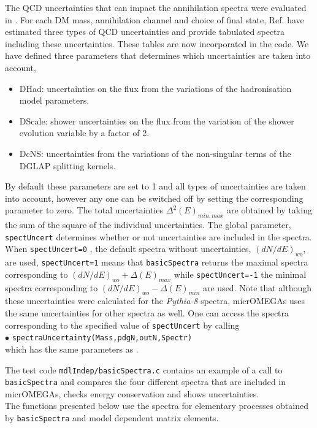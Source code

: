 \documentclass[12pt,a4paper]{article}
\begin{document}
The QCD uncertainties that can impact the  annihilation spectra  were evaluated in \cite{Jueid:2022qjg}. For each DM mass, annihilation channel and choice of final state, Ref.\cite{Jueid:2022qjg} have estimated three types of QCD uncertainties and provide tabulated spectra including these uncertainties.   These tables are now incorporated in the code. 
We have defined three parameters that determines which  uncertainties are taken into account,\begin{itemize}
   \item{DHad:}  uncertainties on the flux from the variations of the hadronisation model parameters.
   \item{DScale:} shower uncertainties on the flux from the variation of the shower evolution variable by a factor of 2.
   \item{DcNS:}  uncertainties  from the variations of the non-singular terms of the DGLAP splitting kernels. 
\end{itemize}
By default  these parameters are set to 1 and all types of uncertainties are taken into account, however any one can be switched off by setting  the corresponding parameter to zero. The total uncertainties $\Delta^2(E)_{min,max}$ are obtained by taking the sum of the square of the individual uncertainties. 
The global parameter, {\tt  spectUncert} determines whether or not uncertainties are included in the spectra. When  {\tt spectUncert=0} , the default spectra without uncertainties,  $(dN/dE)_{wo}$,  are used,  {\tt spectUncert=1} means that {\tt basicSpectra}  returns the maximal  spectra corresponding to $(dN/dE)_{wo}+\Delta(E)_{max}$  while 
 { \tt spectUncert=-1} the minimal spectra corresponding to $(dN/dE)_{wo}-\Delta(E)_{min}$  are used. 
 Note that although these uncertainties were calculated for the { \it Pythia-8} spectra,  micrOMEGAs uses the same uncertainties for other spectra as well. 
 One can access the spectra corresponding to the specified value of {\tt spectUncert} by calling
\\
$\bullet$ \verb|spectraUncertainty(Mass,pdgN,outN,Spectr)|\\
which has the same parameters as {\tt }. 


The test code  {\tt mdlIndep/basicSpectra.c} contains an example of a call to {\tt basicSpectra} and compares the four different spectra that are included in micrOMEGAs,   checks energy conservation and shows uncertainties.  \\

  The functions presented below use the spectra for elementary processes obtained by {\tt basicSpectra} and model dependent matrix elements.
\end{document}
